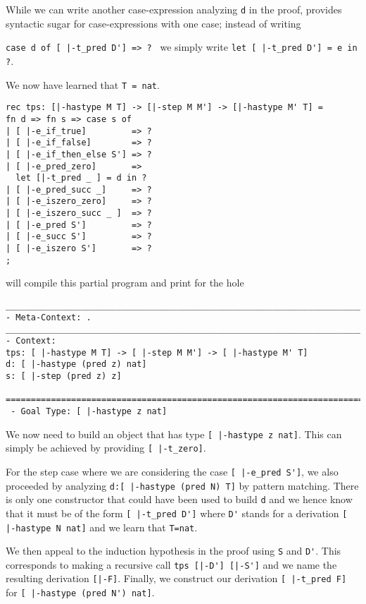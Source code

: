 While we can write another case-expression analyzing
\lstinline!d! in the proof, \beluga provides syntactic sugar for
case-expressions with one case; instead of writing

\noindent
\lstinline!case d of [ |-t_pred D'] => ? ! we simply write
\lstinline!let [ |-t_pred D'] = e in ?!.

\noindent
We now have learned that \lstinline!T = nat!.

\begin{lstlisting}
rec tps: [|-hastype M T] -> [|-step M M'] -> [|-hastype M' T] =
fn d => fn s => case s of
| [ |-e_if_true]         => ?
| [ |-e_if_false]        => ?
| [ |-e_if_then_else S'] => ?
| [ |-e_pred_zero]       =>
  let [|-t_pred _ ] = d in ?
| [ |-e_pred_succ _]     => ?
| [ |-e_iszero_zero]     => ?
| [ |-e_iszero_succ _ ]  => ?
| [ |-e_pred S']         => ?
| [ |-e_succ S']         => ?
| [ |-e_iszero S']       => ?
;
\end{lstlisting}

\beluga will compile this partial program and print for the hole

\begin{lstlisting}
________________________________________________________________________________
- Meta-Context: .
________________________________________________________________________________
- Context:
tps: [ |-hastype M T] -> [ |-step M M'] -> [ |-hastype M' T]
d: [ |-hastype (pred z) nat]
s: [ |-step (pred z) z]

================================================================================
 - Goal Type: [ |-hastype z nat]

\end{lstlisting}



We now need to build an object that has type
\lstinline![ |-hastype z nat]!. This can simply be achieved by
providing
\lstinline![ |-t_zero]!.


For the step case where we are considering the case
\lstinline![ |-e_pred S']!, we also proceeded by analyzing
\lstinline!d:[ |-hastype (pred N) T]! by pattern matching. There is
only one constructor that could have been used to build \lstinline!d!
and we hence know that it must be of the form
\lstinline![ |-t_pred D']! where \lstinline!D'! stands for a
derivation
\lstinline![ |-hastype N nat]! and we learn that \lstinline!T=nat!.

We then appeal to the induction hypothesis in the proof
using \lstinline!S! and \lstinline!D'!. This corresponds to making a
recursive call \lstinline!tps [|-D'] [|-S']! and we name the resulting
derivation \lstinline![|-F]!. Finally, we construct our derivation
\lstinline![ |-t_pred F]! for \lstinline![ |-hastype (pred N') nat]!.

